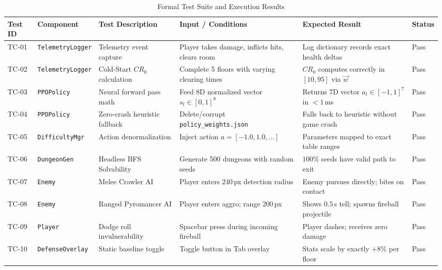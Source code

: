 \begin{table}[!htbp]
\centering
\caption{Formal Test Suite and Execution Results}
\label{tab:test_cases}
\scriptsize
\begin{tabular}{p{}p{}p{}p{}p{}p{}}
\toprule
\textbf{Test ID} & \textbf{Component} & \textbf{Test Description} & \textbf{Input / Conditions} & \textbf{Expected Result} & \textbf{Status} \\
\midrule
TC-01 & \texttt{TelemetryLogger} & Telemetry event capture & Player takes damage, inflicts hits, clears room & Log dictionary records exact health deltas & Pass \\
TC-02 & \texttt{TelemetryLogger} & Cold-Start $CR_0$ calculation & Complete 5 floors with varying clearing times & $CR_0$ computes correctly in $[10, 95]$ via $\vec{w}$ & Pass \\
TC-03 & \texttt{PPOPolicy} & Neural forward pass math & Feed 8D normalized vector $s_t \in [0, 1]^8$ & Returns 7D vector $a_t \in [-1, 1]^7$ in $<1$\,ms & Pass \\
TC-04 & \texttt{PPOPolicy} & Zero-crash heuristic fallback & Delete/corrupt \texttt{policy\_weights.json} & Falls back to heuristic without game crash & Pass \\
TC-05 & \texttt{DifficultyMgr} & Action denormalization & Inject action $a = [-1.0, 1.0, \dots]$ & Parameters mapped to exact table ranges & Pass \\
TC-06 & \texttt{DungeonGen} & Headless BFS Solvability & Generate 500 dungeons with random seeds & $100\%$ seeds have valid path to exit & Pass \\
TC-07 & \texttt{Enemy} & Melee Crawler AI & Player enters $240$\,px detection radius & Enemy pursues directly; bites on contact & Pass \\
TC-08 & \texttt{Enemy} & Ranged Pyromancer AI & Player enters aggro; range $200$\,px & Shows $0.5$\,s tell; spawns fireball projectile & Pass \\
TC-09 & \texttt{Player} & Dodge roll invulnerability & Spacebar press during incoming fireball & Player dashes; receives zero damage & Pass \\
TC-10 & \texttt{DefenseOverlay} & Static baseline toggle & Toggle button in Tab overlay & Stats scale by exactly $+8\%$ per floor & Pass \\
\bottomrule
\end{tabular}
\end{table}

